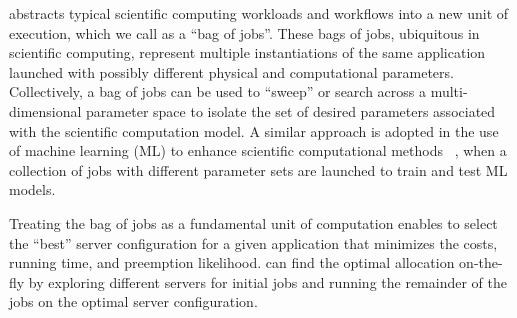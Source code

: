 




\sysname abstracts typical scientific computing workloads and workflows into a new unit of execution, which we call as a ``bag of jobs''. 
These bags of jobs, ubiquitous in scientific computing, represent multiple instantiations of the same application launched with possibly different physical and computational parameters. 
Collectively, a bag of jobs can be used to ``sweep'' or search across a multi-dimensional parameter space to isolate the set of desired parameters associated with the scientific computation model.
A similar approach is adopted in the use of machine learning (ML) to enhance scientific computational methods ~\cite{ml.atomic2017,melko2017,sam2017,fu2017,long2015machine, ferguson2017machine,ward2018matminer}, when a collection of jobs with different  parameter sets are launched to train and test ML models.



%
Treating the bag of jobs as a fundamental unit of computation enables \sysname to select the ``best'' server configuration for a given application that minimizes the costs, running time, and preemption likelihood.
\sysname can find the optimal allocation on-the-fly by exploring different servers for initial jobs and running the remainder of the jobs on the optimal server configuration. 

